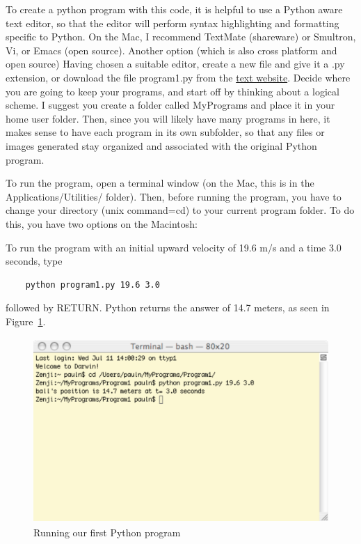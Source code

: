 To create a python program with this code, it is helpful to use a Python aware text editor, so that the editor will perform syntax highlighting and formatting specific to Python. On the Mac, I recommend TextMate (shareware) or Smultron, Vi, or Emacs (open source). Another option (which is also cross platform and open source) Having chosen a suitable editor, create a new file and give it a .py extension, or download the file program1.py from the \href{http://www.usm.maine.edu/~pauln/CompPhysPython}{text website}. Decide where you are going to keep your programs, and start off by thinking about a logical scheme. I suggest you create a folder called MyPrograms and place it in your home user folder. Then, since you will likely have many programs in here, it makes sense to have each program in its own subfolder, so that any files or images generated stay organized and associated with the original Python program.

To run the program, open a terminal window (on the Mac, this is in the Applications/Utilities/ folder). Then, before running the program, you have to change your directory (unix command=cd) to your current program folder. To do this, you have two options on the Macintosh: 
To run the program with an initial upward velocity of 19.6 m/s and a time 3.0 seconds, type
\begin{verbatim}
	python program1.py 19.6 3.0
\end{verbatim}
followed by RETURN.
Python returns the answer of 14.7 meters, as seen in Figure~\ref{fig:FirstPythonProgram}.
\begin{figure}
\centering
\includegraphics[height=7cm]{Figures/4BasicPython/TerminalWindow1}
\caption{Running our first Python program}
\label{fig:FirstPythonProgram}       %
\end{figure}

